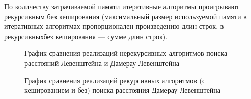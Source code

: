 По количеству затрачиваемой памяти итеративные алгоритмы проигрывают рекурсивным без кеширования (максимальный размер используемой памяти в итеративных алгоритмах пропорционален произведению длин строк, в рекурсивныхбез кеширования — сумме длин строк).

\begin{figure}[h!]
	
	
	\caption{График сравнения реализаций нерекурсивных алгоритмов поиска расстояний Левенштейна и Дамерау-Левенштейна}
	
	\label{fig:fig1}
	
\end{figure}
	
\begin{figure}[h!]
	
	
	\caption{График сравнения реализаций рекурсивных алгоритмов (с кешированием и без) поиска расстояния Дамерау-Левенштейна}
	
	\label{fig:fig2}
	
\end{figure}


